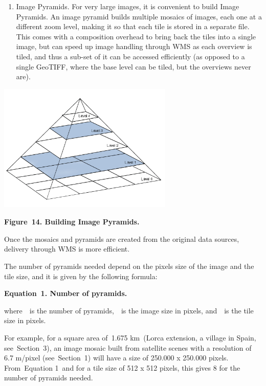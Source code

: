 \documentclass[a4paper]{article}
\newcounter{saveenum}
\newcommand\liststyleLFOxxi{%
\renewcommand\theenumi{\arabic{enumi}}
\renewcommand\theenumii{\alph{enumii}}
\renewcommand\theenumiii{\roman{enumiii}}
\renewcommand\theenumiv{\arabic{enumiv}}
\renewcommand\labelenumi{\theenumi.}
\renewcommand\labelenumii{\theenumii.}
\renewcommand\labelenumiii{\theenumiii.}
\renewcommand\labelenumiv{\theenumiv.}
}
\begin{document}
\liststyleLFOxxi
\setcounter{saveenum}{\value{enumi}}
\begin{enumerate}
\setcounter{enumi}{\value{saveenum}}
\item Image Pyramids. For very large images, it is convenient to build
Image Pyramids. An image pyramid builds multiple mosaics of images,
each one at a different zoom level, making it so that each tile is
stored in a separate file. This comes with a composition overhead to
bring back the tiles into a single image, but can speed up image
handling through WMS as each overview is tiled, and thus a sub-set of
it can be accessed efficiently (as opposed to a single GeoTIFF, where
the base level can be tiled, but the overviews never are).
\end{enumerate}
{\centering 
\includegraphics[width=3.27795in,height=2.4151in]{out-img18.png} \par}

{\centering\bfseries
Figure\ 14. Building Image Pyramids.
\par}

Once the mosaics and pyramids are created from the original data
sources, delivery through WMS is more efficient.\ 

The number of pyramids needed depend on the pixels size of the image and
the tile size, and it is given by the following formula:

{\centering\bfseries
\label{bkm:Ref252536537}Equation\ 1. Number of pyramids.
\par}

{\centering \par}

where\ \ is the number of pyramids,\ \ is the image size in pixels,
and\ \ is the tile size in pixels.

For example, for a square area of\ 1.675 km{\texttwosuperior}\ (Lorca
extension, a village in Spain, see\ Section\ 3), an image mosaic built
from satellite scenes with a resolution of 6.7 m/pixel
(see\ Section\ 1) will have a size of 250.000 x 250.000 pixels.
From\ Equation 1\ and for a tile size of 512 x 512 pixels, this gives 8
for the number of pyramids needed.
\end{document}
